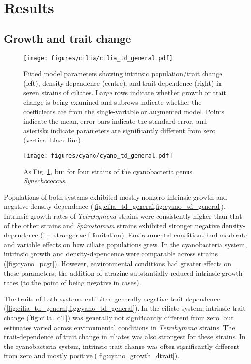 \documentclass{article}
\begin{document}
\section{Results}

\subsection{Growth and trait change}

\begin{figure}[H]
    \centering
    \texttt{[image: figures/cilia/cilia\_td\_general.pdf]}
    \caption{Fitted model parameters showing intrinsic population/trait change (left), density-dependence (centre), and trait dependence (right) in seven strains of ciliates. Large rows indicate whether growth or trait change is being examined and subrows indicate whether the coefficients are from the single-variable or augmented model. Points indicate the mean, error bars indicate the standard error, and asterisks indicate parameters are significantly different from zero (vertical black line).}
    \label{fig:cilia_td_general}
\end{figure}

\begin{figure}[H]
    \centering
    \texttt{[image: figures/cyano/cyano\_td\_general.pdf]}
    \caption{As Fig. \ref{fig:cilia_td_general}, but for four strains of the cyanobacteria genus \emph{Synechococcus}.}
    \label{fig:cyano_td_general}
\end{figure}

Populations of both systems exhibited mostly nonzero intrinsic growth and negative density-dependence (\cref{fig:cilia_td_general,fig:cyano_td_general}). Intrinsic growth rates of \textit{Tetrahymena} strains were consistently higher than that of the other strains and \textit{Spirostomum} strains exhibited stronger negative density-dependence (i.e. stronger self-limitation). Environmental conditions had moderate and variable effects on how ciliate populations grew. In the cyanobacteria system, intrinsic growth and density-dependence were comparable across strains (\cref{fig:cyano_pcgr}). However, environmental conditions had greater effects on these parameters; the addition of atrazine substantially reduced intrinsic growth rates (to the point of being negative in cases). 

The traits of both systems exhibited generally negative trait-dependence (\cref{fig:cilia_td_general,fig:cyano_td_general}). In the ciliate system, intrinsic trait change (\cref{fig:cilia_dT}) was generally not significantly different from zero, but estimates varied across environmental conditions in \textit{Tetrahymena} strains. The trait-dependence of trait change in ciliates was also strongest for these strains. In the cyanobacteria system, intrinsic trait change was often significantly different from zero and mostly positive (\cref{fig:cyano_growth_dtrait}).
\end{document}
